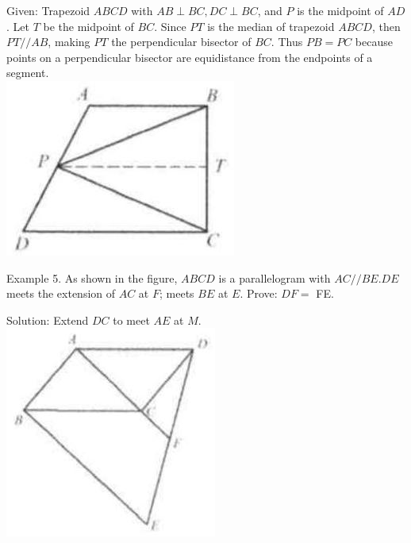 \documentclass[10pt]{article}
\begin{document}
Given: Trapezoid \(A B C D\) with \(A B \perp B C, D C \perp B C\), and \(P\) is the midpoint of \(A D\). Let \(T\) be the midpoint of \(B C\). Since \(P T\) is the median of trapezoid \(A B C D\), then \(P T / / A B\), making \(P T\) the perpendicular bisector of \(B C\). Thus \(P B=P C\) because points on a perpendicular bisector are equidistance from the endpoints of a segment.\\
\includegraphics[max width=\textwidth, center]{2025_04_17_97bc1f7e44d93c271a88g-037(1)}

Example 5. As shown in the figure, \(A B C D\) is a parallelogram with \(A C / / B E . D E\) meets the extension of \(A C\) at \(F\); meets \(B E\) at \(E\). Prove: \(D F=\) FE.

Solution:
Extend \(D C\) to meet \(A E\) at \(M\).\\
\includegraphics[max width=\textwidth, center]{2025_04_17_97bc1f7e44d93c271a88g-037}
\end{document}
